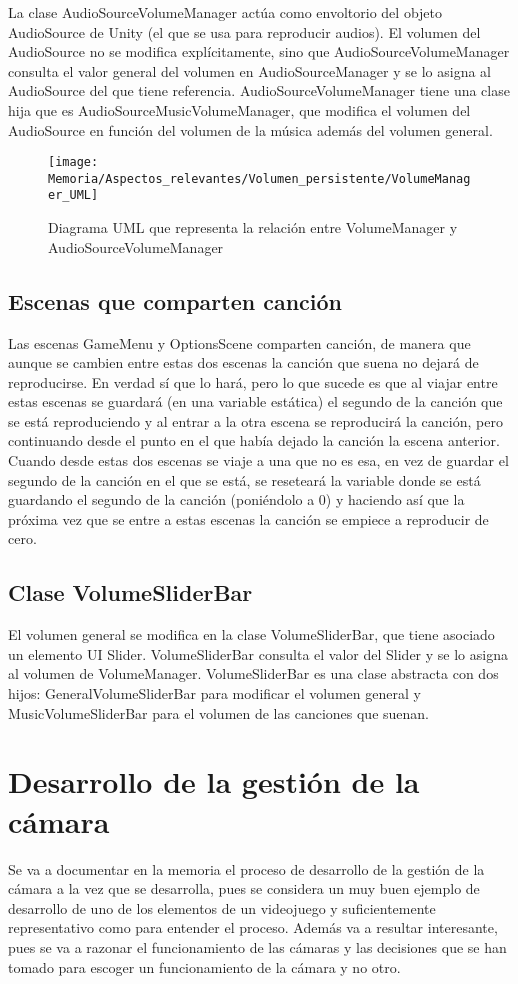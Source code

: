 La clase AudioSourceVolumeManager actúa como envoltorio del objeto AudioSource de Unity (el que se usa para reproducir audios). El volumen del AudioSource no se modifica explícitamente, sino que AudioSourceVolumeManager consulta el valor general del volumen en AudioSourceManager y se lo asigna al AudioSource del que tiene referencia. AudioSourceVolumeManager tiene una clase hija que es AudioSourceMusicVolumeManager, que modifica el volumen del AudioSource en función del volumen de la música además del volumen general.

\begin{figure}[h]
\texttt{[image: Memoria/Aspectos\_relevantes/Volumen\_persistente/VolumeManager\_UML]}
\caption{Diagrama UML que representa la relación entre VolumeManager y AudioSourceVolumeManager}
\end{figure}

\subsection{Escenas que comparten canción}
Las escenas GameMenu y OptionsScene comparten canción, de manera que aunque se cambien entre estas dos escenas la canción que suena no dejará de reproducirse. En verdad sí que lo hará, pero lo que sucede es que al viajar entre estas escenas se guardará (en una variable estática) el segundo de la canción que se está reproduciendo y al entrar a la otra escena se reproducirá la canción, pero continuando desde el punto en el que había dejado la canción la escena anterior. Cuando desde estas dos escenas se viaje a una que no es esa, en vez de guardar el segundo de la canción en el que se está, se reseteará la variable donde se está guardando el segundo de la canción (poniéndolo a 0) y haciendo así que la próxima vez que se entre a estas escenas la canción se empiece a reproducir de cero.

\subsection{Clase VolumeSliderBar}
El volumen general se modifica en la clase VolumeSliderBar, que tiene asociado un elemento UI Slider. VolumeSliderBar consulta el valor del Slider y se lo asigna al volumen de VolumeManager. VolumeSliderBar es una clase abstracta con dos hijos: GeneralVolumeSliderBar para modificar el volumen general y MusicVolumeSliderBar para el volumen de las canciones que suenan.

\section{Desarrollo de la gestión de la cámara}
Se va a documentar en la memoria el proceso de desarrollo de la gestión de la cámara a la vez que se desarrolla, pues se considera un muy buen ejemplo de desarrollo de uno de los elementos de un videojuego y suficientemente representativo como para entender el proceso. Además va a resultar interesante, pues se va a razonar el funcionamiento de las cámaras y las decisiones que se han tomado para escoger un funcionamiento de la cámara y no otro.

